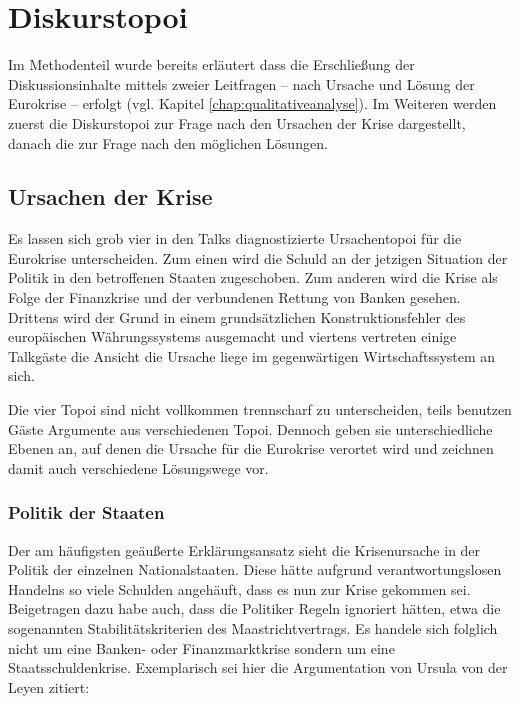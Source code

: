 \section{Diskurstopoi}\label{chap:diskurstopoi}

Im Methodenteil wurde bereits erläutert dass die Erschließung der Diskussionsinhalte mittels zweier Leitfragen – nach Ursache und Lösung der Eurokrise – erfolgt (vgl. Kapitel \vref{chap:qualitativeanalyse}). Im Weiteren werden zuerst die Diskurstopoi zur Frage nach den Ursachen der Krise dargestellt, danach die zur Frage nach den möglichen Lösungen.

\subsection{Ursachen der Krise}

Es lassen sich grob vier in den Talks diagnostizierte Ursachentopoi für die Eurokrise unterscheiden. Zum einen wird die Schuld an der jetzigen Situation der Politik in den betroffenen Staaten zugeschoben. Zum anderen wird die Krise als Folge der Finanzkrise und der verbundenen Rettung von Banken gesehen. Drittens wird der Grund in einem grundsätzlichen Konstruktionsfehler des europäischen Währungssystems ausgemacht und viertens vertreten einige Talkgäste die Ansicht die Ursache liege im gegenwärtigen Wirtschaftssystem an sich.

Die vier Topoi sind nicht vollkommen trennscharf zu unterscheiden, teils benutzen Gäste Argumente aus verschiedenen Topoi. Dennoch geben sie unterschiedliche Ebenen an, auf denen die Ursache für die Eurokrise verortet wird und zeichnen damit auch verschiedene Lösungswege vor.

\subsubsection{Politik der Staaten}

Der am häufigsten geäußerte Erklärungsansatz sieht die Krisenursache in der Politik der einzelnen Nationalstaaten. Diese hätte aufgrund verantwortungslosen Handelns so viele Schulden angehäuft, dass es nun zur Krise gekommen sei. Beigetragen dazu habe auch, dass die Politiker Regeln ignoriert hätten, etwa die sogenannten Stabilitätskriterien des Maastrichtvertrags. Es handele sich folglich nicht um eine Banken- oder Finanzmarktkrise sondern um eine Staatsschuldenkrise. Exemplarisch sei hier die Argumentation von Ursula von der Leyen zitiert:

